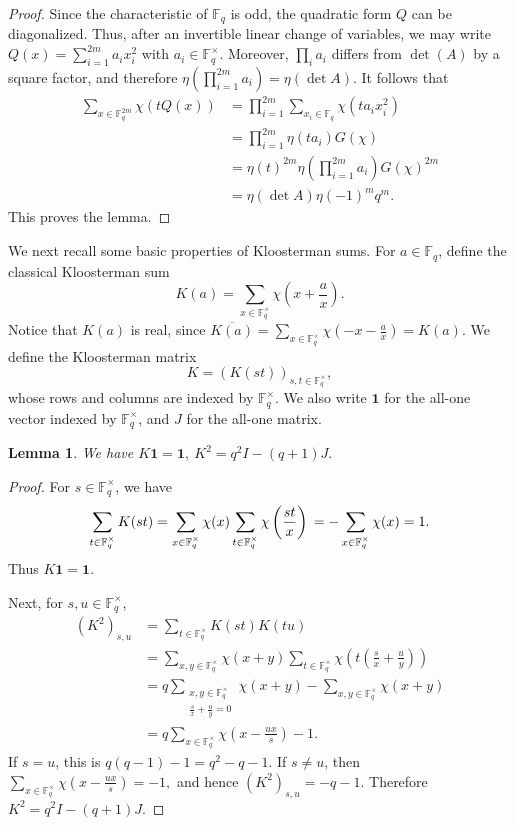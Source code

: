 \documentclass[11pt]{article}
\newtheorem{lemma}[theorem]{Lemma}
\newcommand{\1}{\mathbf{1}}
\begin{document}
\begin{proof}
	Since the characteristic of \(\mathbb{F}_q\) is odd, the quadratic form \(Q\) can be diagonalized. Thus, after an invertible linear change of variables, we may write $Q(x)=\sum_{i=1}^{2m}a_i x_i^2$
	with \(a_i\in\mathbb{F}_q^\times\). Moreover, \(\prod_i a_i\) differs from \(\det(A)\) by a square factor, and therefore $\eta\left(\prod_{i=1}^{2m}a_i\right)=\eta(\det A).$
	It follows that
	\begin{align*}
		\sum_{x\in\mathbb{F}_q^{2m}}\chi(tQ(x))
		&=
		\prod_{i=1}^{2m}
		\sum_{x_i\in\mathbb{F}_q}\chi(ta_i x_i^2)  \\
		&=
		\prod_{i=1}^{2m}\eta(ta_i)G(\chi)  \\
		&=
		\eta(t)^{2m}
		\eta\left(\prod_{i=1}^{2m}a_i\right)
		G(\chi)^{2m}  \\
		&=
		\eta(\det A)\eta(-1)^m q^m.
	\end{align*}
	This proves the lemma.
\end{proof}

We next recall some basic properties of Kloosterman sums. For \(a\in\mathbb{F}_q\), define the classical Kloosterman sum
\[
K(a)=\sum_{x\in\mathbb{F}_q^\times}\chi\left(x+\frac{a}{x}\right).
\]
Notice that \(K(a)\) is real, since $\overline{K(a)}
=
\sum_{x\in\mathbb{F}_q^\times}
\chi\left(-x-\frac{a}{x}\right)
=
K(a).$
We define the Kloosterman matrix
\[
K=(K(st))_{s,t\in\mathbb{F}_q^\times},
\]
whose rows and columns are indexed by \(\mathbb{F}_q^\times\). We also write \(\mathbf{1}\) for the all-one vector indexed by \(\mathbb{F}_q^\times\), and \(J\) for the all-one matrix.

\begin{lemma}\label{lem-1}
	We have $	K\mathbf{1}=\mathbf{1},\
	K^2=q^2I-(q+1)J.$
\end{lemma}

\begin{proof}
	For \(s\in\mathbb{F}_q^\times\), we have
	\[\sum_{t\in\mathbb{F}_q^\times}K(st)
	=
	\sum_{x\in\mathbb{F}_q^\times}
	\chi(x)
	\sum_{t\in\mathbb{F}_q^\times}
	\chi\left(\frac{st}{x}\right)  \\
	=
	-\sum_{x\in\mathbb{F}_q^\times}\chi(x)
	=
	1.\]
	Thus \(K\mathbf{1}=\mathbf{1}\).
	
	Next, for \(s,u\in\mathbb{F}_q^\times\),
	\begin{align*}
		(K^2)_{s,u}
		&=
		\sum_{t\in\mathbb{F}_q^\times}K(st)K(tu)  \\
		&=
		\sum_{x,y\in\mathbb{F}_q^\times}
		\chi(x+y)
		\sum_{t\in\mathbb{F}_q^\times}
		\chi\left(t\left(\frac{s}{x}+\frac{u}{y}\right)\right)  \\
		&=
		q
		\sum_{\substack{x,y\in\mathbb{F}_q^\times\\ \frac{s}{x}+\frac{u}{y}=0}}
		\chi(x+y)
		-
		\sum_{x,y\in\mathbb{F}_q^\times}\chi(x+y)  \\
		&=
		q\sum_{x\in\mathbb{F}_q^\times}
		\chi\left(x-\frac{ux}{s}\right)
		-1.
	\end{align*}
	If \(s=u\), this is \(q(q-1)-1=q^2-q-1\). If \(s\ne u\), then $\sum_{x\in\mathbb{F}_q^\times}
	\chi\left(x-\frac{ux}{s}\right)=-1,$
	and hence \((K^2)_{s,u}=-q-1\). Therefore $	K^2=q^2I-(q+1)J.$
\end{proof}
\end{document}
